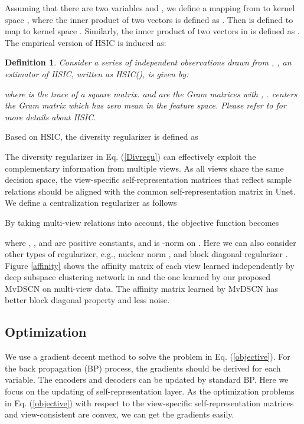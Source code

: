 \documentclass[journal]{IEEEtran}
\newtheorem{myDef}{Definition}
\begin{document}
Assuming that there are two variables  and ,
we define a mapping  from  to kernel space , where the inner product of two vectors is defined as .
Then  is defined to map  to kernel space .
Similarly, the inner product of two vectors in  is defined as .
The empirical version of HSIC is induced as:
\begin{myDef}
Consider a series of  independent observations drawn from , , an estimator of HSIC, written as HSIC(), is given by:

where  is the trace of a square matrix.  and  are the Gram matrices with , .  centers the Gram matrix which has zero mean in the feature space. Please refer to \cite{gretton2005measuring, Cao2015DiversityinducedMS} for more details about HSIC.
\end{myDef}
Based on HSIC, the diversity regularizer is defined as

The diversity regularizer in Eq. (\ref{Divregu}) can effectively exploit the complementary information from multiple views.
As all views share the same decision space, the view-specific self-representation matrices that reflect sample relations should be aligned with the common self-representation matrix in Unet. We define a centralization regularizer as follows

By taking multi-view relations into account, the objective function becomes

where , ,  and  are positive constants, and  is -norm on . Here we can also consider other types of regularizer, e.g., nuclear norm \cite{Guangcan2013Robust}, and block diagonal regularizer \cite{lu2019subspace}.
Figure \ref{affinity} shows the affinity matrix of each view learned independently by deep subspace clustering network in \cite{ji2017deep} and the one learned by our proposed MvDSCN on multi-view data.  The affinity matrix learned by MvDSCN has better block diagonal property and less noise.


\subsection{Optimization}
We use a gradient decent method to solve the problem in Eq. (\ref{objective}).
For the back propagation (BP) process, the gradients should be derived for each variable.
The encoders and decoders can be updated by standard BP.
Here we focus on the updating of self-representation layer.
As the optimization problems in Eq. (\ref{objective}) with respect to the view-specific self-representation matrices  and view-consistent  are convex, we can get the gradients easily.
\end{document}
